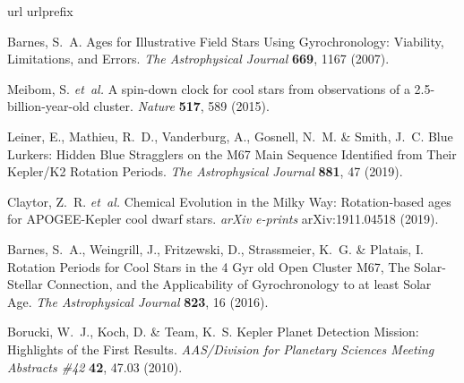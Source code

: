 \begin{thebibliography}{10}
\expandafter\ifx\csname url\endcsname\relax
  \def\url#1{\texttt{#1}}\fi
\expandafter\ifx\csname urlprefix\endcsname\relax\def\urlprefix{URL }\fi
\providecommand{\bibinfo}[2]{#2}
\providecommand{\eprint}[2][]{\url{#2}}

\bibinfo{author}{Barnes, S.~A.}
\newblock \bibinfo{title}{Ages for {{Illustrative Field Stars Using
  Gyrochronology}}: {{Viability}}, {{Limitations}}, and {{Errors}}}.
\newblock \emph{\bibinfo{journal}{The Astrophysical Journal}}
  \textbf{\bibinfo{volume}{669}}, \bibinfo{pages}{1167} (\bibinfo{year}{2007}).

\bibinfo{author}{Meibom, S.} \emph{et~al.}
\newblock \bibinfo{title}{A spin-down clock for cool stars from observations of
  a 2.5-billion-year-old cluster}.
\newblock \emph{\bibinfo{journal}{Nature}} \textbf{\bibinfo{volume}{517}},
  \bibinfo{pages}{589} (\bibinfo{year}{2015}).

\bibinfo{author}{Leiner, E.}, \bibinfo{author}{Mathieu, R.~D.},
  \bibinfo{author}{Vanderburg, A.}, \bibinfo{author}{Gosnell, N.~M.} \&
  \bibinfo{author}{Smith, J.~C.}
\newblock \bibinfo{title}{Blue {{Lurkers}}: {{Hidden Blue Stragglers}} on the
  {{M67 Main Sequence Identified}} from {{Their Kepler}}/{{K2 Rotation
  Periods}}}.
\newblock \emph{\bibinfo{journal}{The Astrophysical Journal}}
  \textbf{\bibinfo{volume}{881}}, \bibinfo{pages}{47} (\bibinfo{year}{2019}).

\bibinfo{author}{Claytor, Z.~R.} \emph{et~al.}
\newblock \bibinfo{title}{Chemical {{Evolution}} in the {{Milky Way}}:
  {{Rotation}}-based ages for {{APOGEE}}-{{Kepler}} cool dwarf stars}.
\newblock \emph{\bibinfo{journal}{arXiv e-prints}}
  \bibinfo{pages}{arXiv:1911.04518} (\bibinfo{year}{2019}).

\bibinfo{author}{Barnes, S.~A.}, \bibinfo{author}{Weingrill, J.},
  \bibinfo{author}{Fritzewski, D.}, \bibinfo{author}{Strassmeier, K.~G.} \&
  \bibinfo{author}{Platais, I.}
\newblock \bibinfo{title}{Rotation {{Periods}} for {{Cool Stars}} in the 4
  {{Gyr}} old {{Open Cluster M67}}, {{The Solar}}-{{Stellar Connection}}, and
  the {{Applicability}} of {{Gyrochronology}} to at least {{Solar Age}}}.
\newblock \emph{\bibinfo{journal}{The Astrophysical Journal}}
  \textbf{\bibinfo{volume}{823}}, \bibinfo{pages}{16} (\bibinfo{year}{2016}).

\bibinfo{author}{Borucki, W.~J.}, \bibinfo{author}{Koch, D.} \&
  \bibinfo{author}{Team, K.~S.}
\newblock \bibinfo{title}{Kepler {{Planet Detection Mission}}: {{Highlights}}
  of the {{First Results}}}.
\newblock \emph{\bibinfo{journal}{AAS/Division for Planetary Sciences Meeting
  Abstracts \#42}} \textbf{\bibinfo{volume}{42}}, \bibinfo{pages}{47.03}
  (\bibinfo{year}{2010}).


\end{thebibliography}
